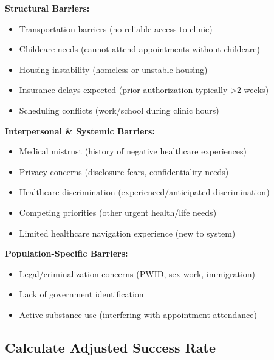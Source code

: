 \documentclass[11pt]{article}
\begin{document}
\begin{tcolorbox}[colback=yellow!10!white,colframe=yellow!75!black,breakable]
\textbf{Structural Barriers:}

\begin{itemize}[label=$\square$,leftmargin=*]
\item Transportation barriers (no reliable access to clinic)
\item Childcare needs (cannot attend appointments without childcare)
\item Housing instability (homeless or unstable housing)
\item Insurance delays expected (prior authorization typically >2 weeks)
\item Scheduling conflicts (work/school during clinic hours)
\end{itemize}

\textbf{Interpersonal \& Systemic Barriers:}

\begin{itemize}[label=$\square$,leftmargin=*]
\item Medical mistrust (history of negative healthcare experiences)
\item Privacy concerns (disclosure fears, confidentiality needs)
\item Healthcare discrimination (experienced/anticipated discrimination)
\item Competing priorities (other urgent health/life needs)
\item Limited healthcare navigation experience (new to system)
\end{itemize}

\textbf{Population-Specific Barriers:}

\begin{itemize}[label=$\square$,leftmargin=*]
\item Legal/criminalization concerns (PWID, sex work, immigration)
\item Lack of government identification
\item Active substance use (interfering with appointment attendance)
\end{itemize}
\end{tcolorbox}

\subsection{Calculate Adjusted Success Rate}
\end{document}

